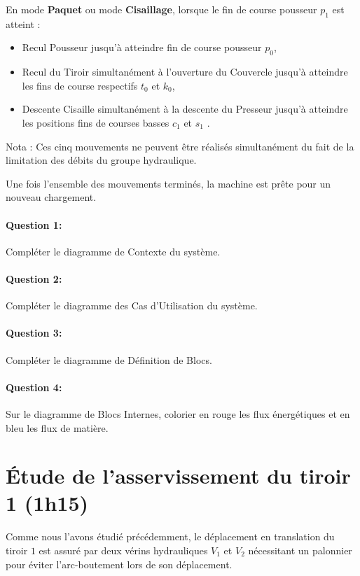En mode \textbf{Paquet} ou mode \textbf{Cisaillage}, lorsque le fin de course pousseur $p_1$ est atteint :
\begin{itemize}
 \item Recul \og Pousseur \fg jusqu'à atteindre fin de course pousseur $p_0$,
 \item Recul du \og Tiroir \fg simultanément à l'ouverture du \og Couvercle \fg jusqu'à atteindre les fins de course respectifs $t_0$ et $k_0$,
 \item Descente \og Cisaille \fg simultanément à la descente du \og Presseur \fg jusqu'à atteindre les positions fins de courses basses $c_1$ et $s_1$	.
\end{itemize}

Nota : Ces cinq mouvements ne peuvent être réalisés simultanément du fait de la limitation des débits du groupe hydraulique.

Une fois l'ensemble des mouvements terminés, la machine est prête pour un nouveau chargement.

\paragraph{Question 1:} Compléter le diagramme de Contexte du système.

\paragraph{Question 2:} Compléter le diagramme des Cas d'Utilisation du système.

\paragraph{Question 3:} Compléter le diagramme de Définition de Blocs.

\paragraph{Question 4:} Sur le diagramme de Blocs Internes, colorier en rouge les flux énergétiques et en bleu les flux de matière.

\section{Étude de l'asservissement du tiroir 1 (1h15)}

Comme nous l'avons étudié précédemment, le déplacement en translation du tiroir $1$ est assuré par deux vérins hydrauliques $V_1$ et $V_2$ nécessitant un palonnier pour éviter l'arc-boutement lors de son déplacement.

